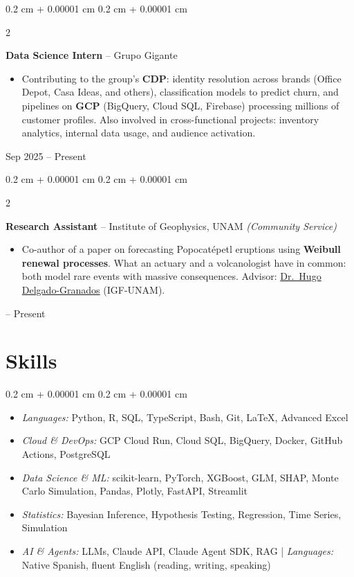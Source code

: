 \documentclass[10pt, letterpaper]{article}
\newenvironment{highlights}{
    \begin{itemize}[
        topsep=0.05 cm,
        parsep=0.05 cm,
        partopsep=0pt,
        itemsep=0pt,
        leftmargin=0.4 cm + 10pt
    ]
}{
    \end{itemize}
}
\newenvironment{highlightsforbulletentries}{
    \begin{itemize}[
        topsep=0.05 cm,
        parsep=0.05 cm,
        partopsep=0pt,
        itemsep=0pt,
        leftmargin=10pt
    ]
}{
    \end{itemize}
}
\newenvironment{onecolentry}{
    \begin{adjustwidth}{
        0.2 cm + 0.00001 cm
    }{
        0.2 cm + 0.00001 cm
    }
}{
    \end{adjustwidth}
}
\newenvironment{twocolentry}[2][]{
    \onecolentry
    \def\secondColumn{#2}
    \setcolumnwidth{\fill, 4.5 cm}
    \begin{paracol}{2}
}{
    \switchcolumn \raggedleft \secondColumn
    \end{paracol}
    \endonecolentry
}
\let\hrefWithoutArrow\href
\renewcommand{\href}[2]{\hrefWithoutArrow{#1}{\ifthenelse{\equal{#2}{}}{ }{#2 }\raisebox{.15ex}{\footnotesize \faExternalLink*}}}
\begin{document}
        \begin{twocolentry}{
            Sep 2025 -- Present
        }
            \textbf{Data Science Intern} -- Grupo Gigante
            \begin{highlights}
                \item Contributing to the group's \textbf{CDP}: identity resolution across brands (Office Depot, Casa Ideas, and others), classification models to predict churn, and pipelines on \textbf{GCP} (BigQuery, Cloud SQL, Firebase) processing millions of customer profiles. Also involved in cross-functional projects: inventory analytics, internal data usage, and audience activation.
            \end{highlights}
        \end{twocolentry}

        \vspace{0.10 cm}

        \begin{twocolentry}{
            2025 -- Present
        }
            \textbf{Research Assistant} -- Institute of Geophysics, UNAM \textit{(Community Service)}
            \begin{highlights}
                \item Co-author of a paper on forecasting Popocatépetl eruptions using \textbf{Weibull renewal processes}. What an actuary and a volcanologist have in common: both model rare events with massive consequences. Advisor: \hrefWithoutArrow{https://scholar.google.com/citations?user=lDD0DZQAAAAJ}{Dr.\ Hugo Delgado-Granados} (IGF-UNAM).
            \end{highlights}
        \end{twocolentry}


    \section{Skills}

\begin{onecolentry}
    \begin{highlightsforbulletentries}
        \item \textit{Languages:} Python, R, SQL, TypeScript, Bash, Git, \LaTeX, Advanced Excel
        \item \textit{Cloud \& DevOps:} GCP Cloud Run, Cloud SQL, BigQuery, Docker, GitHub Actions, PostgreSQL
        \item \textit{Data Science \& ML:} scikit-learn, PyTorch, XGBoost, GLM, SHAP, Monte Carlo Simulation, Pandas, Plotly, FastAPI, Streamlit
        \item \textit{Statistics:} Bayesian Inference, Hypothesis Testing, Regression, Time Series, Simulation
        \item \textit{AI \& Agents:} LLMs, Claude API, Claude Agent SDK, RAG | \textit{Languages:} Native Spanish, fluent English (reading, writing, speaking)
    \end{highlightsforbulletentries}
\end{onecolentry}
\end{document}
